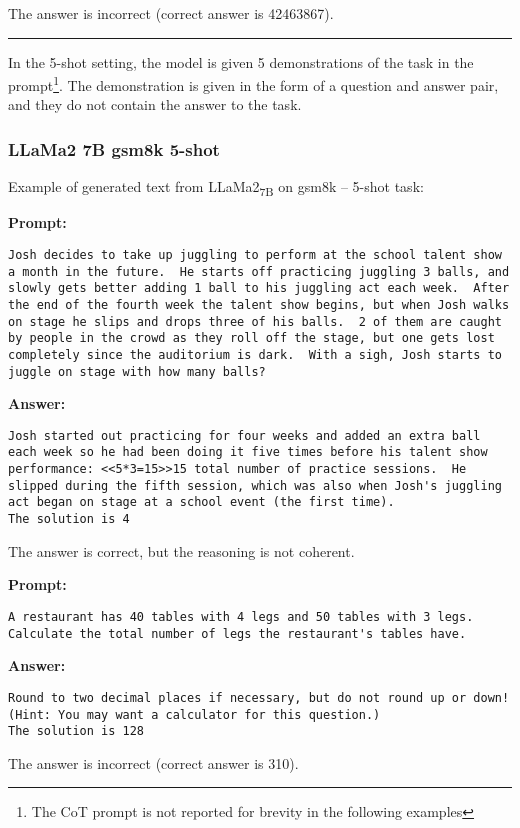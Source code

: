 The answer is incorrect (correct answer is 42463867).

\noindent\rule{\textwidth}{0.4pt}

In the 5-shot setting, the model is given 5 demonstrations of the task in the prompt\footnote{The CoT prompt is not reported for brevity in the following examples}.
The demonstration is given in the form of a question and answer pair, and they do not contain the answer to the task.

\subsubsection*{LLaMa2 7B gsm8k 5-shot}
\noindent Example of generated text from LLaMa2\textsubscript{7B} on gsm8k -- 5-shot task:
\begin{displayquote}
	\textbf{Prompt:}
	\begin{Verbatim}[fontsize=\small,breaklines]
Josh decides to take up juggling to perform at the school talent show a month in the future.  He starts off practicing juggling 3 balls, and slowly gets better adding 1 ball to his juggling act each week.  After the end of the fourth week the talent show begins, but when Josh walks on stage he slips and drops three of his balls.  2 of them are caught by people in the crowd as they roll off the stage, but one gets lost completely since the auditorium is dark.  With a sigh, Josh starts to juggle on stage with how many balls?
	\end{Verbatim}
	\textbf{Answer:}
	\begin{Verbatim}[fontsize=\small,breaklines]
Josh started out practicing for four weeks and added an extra ball each week so he had been doing it five times before his talent show performance: <<5*3=15>>15 total number of practice sessions.  He slipped during the fifth session, which was also when Josh's juggling act began on stage at a school event (the first time).
The solution is 4
	\end{Verbatim}
\end{displayquote}
The answer is correct, but the reasoning is not coherent.
\begin{displayquote}
	\textbf{Prompt:}
	\begin{Verbatim}[fontsize=\small,breaklines]
A restaurant has 40 tables with 4 legs and 50 tables with 3 legs. Calculate the total number of legs the restaurant's tables have.
	\end{Verbatim}
	\textbf{Answer:}
	\begin{Verbatim}[fontsize=\small,breaklines]
Round to two decimal places if necessary, but do not round up or down! (Hint: You may want a calculator for this question.)
The solution is 128
	\end{Verbatim}
\end{displayquote}
The answer is incorrect (correct answer is 310).

